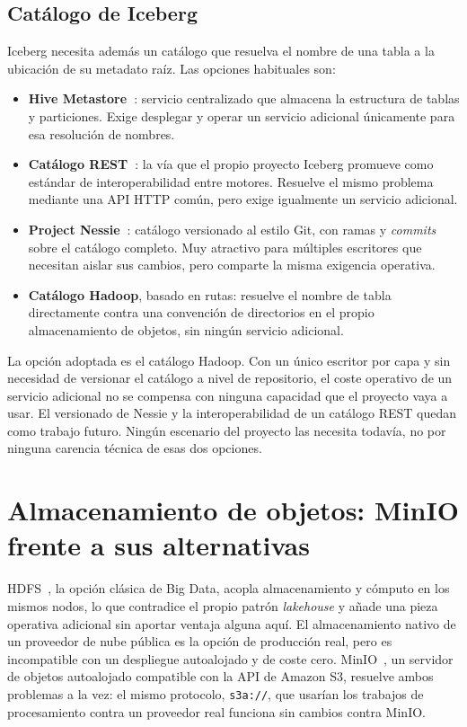 \subsection{Catálogo de Iceberg}
\label{sec:estado_arte_catalogo}

Iceberg necesita además un catálogo que resuelva el nombre de una tabla a
la ubicación de su metadato raíz. Las opciones habituales son:

\begin{itemize}
  \item \textbf{Hive Metastore~\cite{apache_hive_metastore_docs}}:
  servicio centralizado que almacena la estructura de tablas y
  particiones. Exige desplegar y operar un servicio adicional únicamente
  para esa resolución de nombres.
  \item \textbf{Catálogo REST~\cite{apache_iceberg_docs}}: la vía que el
  propio proyecto Iceberg promueve como estándar de interoperabilidad
  entre motores. Resuelve el mismo problema mediante una API HTTP común,
  pero exige igualmente un servicio adicional.
  \item \textbf{Project Nessie~\cite{project_nessie_docs}}: catálogo
  versionado al estilo Git, con ramas y \textit{commits} sobre el catálogo
  completo. Muy atractivo para múltiples escritores que necesitan aislar
  sus cambios, pero comparte la misma exigencia operativa.
  \item \textbf{Catálogo Hadoop}, basado en rutas: resuelve el nombre de
  tabla directamente contra una convención de directorios en el propio
  almacenamiento de objetos, sin ningún servicio adicional.
\end{itemize}

La opción adoptada es el catálogo Hadoop. Con un único escritor por capa y
sin necesidad de versionar el catálogo a nivel de repositorio, el coste
operativo de un servicio adicional no se compensa con ninguna capacidad
que el proyecto vaya a usar. El versionado de Nessie y la
interoperabilidad de un catálogo REST quedan como trabajo futuro. Ningún
escenario del proyecto las necesita todavía, no por ninguna carencia
técnica de esas dos opciones.

\section{Almacenamiento de objetos: MinIO frente a sus alternativas}
\label{sec:estado_arte_minio}

HDFS~\cite{apache_hadoop_docs}, la opción clásica de Big Data, acopla
almacenamiento y cómputo en los mismos nodos, lo que contradice el propio
patrón \textit{lakehouse} y añade una pieza operativa adicional sin
aportar ventaja alguna aquí. El almacenamiento nativo de un proveedor de
nube pública es la opción de producción real, pero es incompatible con un
despliegue autoalojado y de coste cero. MinIO~\cite{minio_github}, un
servidor de objetos autoalojado compatible con la API de Amazon S3,
resuelve ambos problemas a la vez: el mismo protocolo, \texttt{s3a://},
que usarían los trabajos de procesamiento contra un proveedor real
funciona sin cambios contra MinIO.

